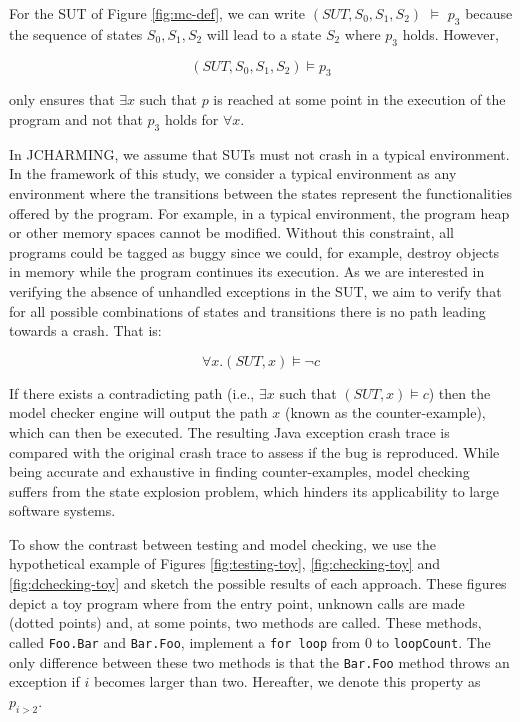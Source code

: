 \documentclass[12pt]{report}
\begin{document}
For the SUT of Figure \ref{fig:mc-def}, we can write
\((SUT, {S_0, S_1, S_2})\) \(\models\) \(p_3\) because the sequence of
states \({S_0, S_1, S_2}\) will lead to a state \(S_2\) where \(p_3\)
holds. However,

\begin{equation}
(SUT, S_0, S_1, S_2) \models p_3
\end{equation}

only ensures that \(\exists x\) such that \(p\) is reached at some point
in the execution of the program and not that \(p_3\) holds for
\(\forall x\).

In JCHARMING, we assume that SUTs must not crash in a typical
environment. In the framework of this study, we consider a typical
environment as any environment where the transitions between the states
represent the functionalities offered by the program. For example, in a
typical environment, the program heap or other memory spaces cannot be
modified. Without this constraint, all programs could be tagged as buggy
since we could, for example, destroy objects in memory while the program
continues its execution. As we are interested in verifying the absence
of unhandled exceptions in the SUT, we aim to verify that for all
possible combinations of states and transitions there is no path leading
towards a crash. That is:

\begin{equation}
\forall x.(SUT, x) \models \neg c
\end{equation}

If there exists a contradicting path (i.e., \(\exists x\) such that
\((SUT, x) \models c\)) then the model checker engine will output the
path \(x\) (known as the counter-example), which can then be executed.
The resulting Java exception crash trace is compared with the original
crash trace to assess if the bug is reproduced. While being accurate and
exhaustive in finding counter-examples, model checking suffers from the
state explosion problem, which hinders its applicability to large
software systems.

To show the contrast between testing and model checking, we use the
hypothetical example of Figures \ref{fig:testing-toy},
\ref{fig:checking-toy} and \ref{fig:dchecking-toy} and sketch the
possible results of each approach. These figures depict a toy program
where from the entry point, unknown calls are made (dotted points) and,
at some points, two methods are called. These methods, called
\texttt{Foo.Bar} and \texttt{Bar.Foo}, implement a \texttt{for loop}
from 0 to \texttt{loopCount}. The only difference between these two
methods is that the \texttt{Bar.Foo} method throws an exception if \(i\)
becomes larger than two. Hereafter, we denote this property as
\(p_{i > 2}\).
\end{document}
